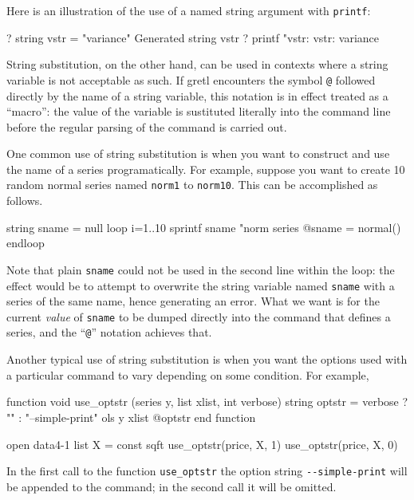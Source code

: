 Here is an illustration of the use of a named string argument with
\texttt{printf}:
%
\begin{code}
? string vstr = "variance"
Generated string vstr
? printf "vstr: %
vstr:     variance
\end{code}

String substitution, on the other hand, can be used in contexts where
a string variable is not acceptable as such. If gretl encounters
the symbol \verb|@| followed directly by the name of a string
variable, this notation is in effect treated as a ``macro'': the value
of the variable is sustituted literally into the command line before
the regular parsing of the command is carried out.

One common use of string substitution is when you want to construct
and use the name of a series programatically. For example, suppose you
want to create 10 random normal series named \texttt{norm1} to
\texttt{norm10}. This can be accomplished as follows.
%
\begin{code}
string sname = null
loop i=1..10
  sprintf sname "norm%
  series @sname = normal()
endloop
\end{code}
%
Note that plain \texttt{sname} could not be used in the second line
within the loop: the effect would be to attempt to overwrite the
string variable named \texttt{sname} with a series of the same name,
hence generating an error. What we want is for the current
\textit{value} of \texttt{sname} to be dumped directly into the
command that defines a series, and the ``\verb|@|'' notation achieves
that.

Another typical use of string substitution is when you want the
options used with a particular command to vary depending on
some condition. For example,
%
\begin{code}
function void use_optstr (series y, list xlist, int verbose)
   string optstr = verbose ? "" : "--simple-print"
   ols y xlist @optstr 
end function

open data4-1
list X = const sqft
use_optstr(price, X, 1)
use_optstr(price, X, 0)
\end{code}

In the first call to the function \texttt{use\_optstr} the option
string \verb|--simple-print| will be appended to the 
command; in the second call it will be omitted.

